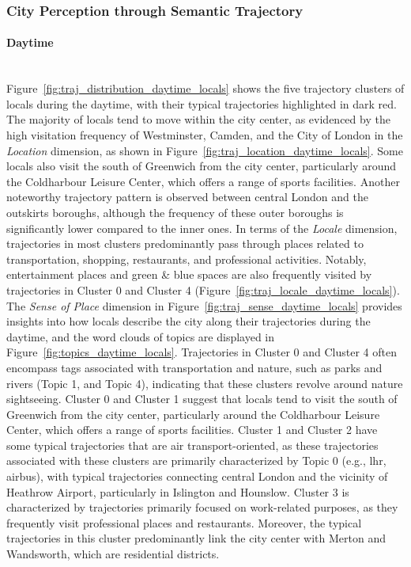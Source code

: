 \documentclass{article}
\newcommand{\subsubsubsection}[1]{\paragraph{#1}\mbox{}\\}
\theoremstyle{definition}
\theoremstyle{remark}
\begin{document}
\subsubsection{City Perception through Semantic Trajectory} \label{perception_through_traj}


\subsubsubsection{Daytime}

Figure~\ref{fig:traj_distribution_daytime_locals} shows the five trajectory clusters of locals during the daytime, with their typical trajectories highlighted in dark red. The majority of locals tend to move within the city center, as evidenced by the high visitation frequency of Westminster, Camden, and the City of London in the \textit{Location} dimension, as shown in Figure~\ref{fig:traj_location_daytime_locals}. Some locals also visit the south of Greenwich from the city center, particularly around the Coldharbour Leisure Center, which offers a range of sports facilities. Another noteworthy trajectory pattern is observed between central London and the outskirts boroughs, although the frequency of these outer boroughs is significantly lower compared to the inner ones. In terms of the \textit{Locale} dimension, trajectories in most clusters predominantly pass through places related to transportation, shopping, restaurants, and professional activities. Notably, entertainment places and green \& blue spaces are also frequently visited by trajectories in Cluster 0 and Cluster 4 (Figure~\ref{fig:traj_locale_daytime_locals}). The \textit{Sense of Place} dimension in Figure~\ref{fig:traj_sense_daytime_locals} provides insights into how locals describe the city along their trajectories during the daytime, and the word clouds of topics are displayed in Figure~\ref{fig:topics_daytime_locals}. Trajectories in Cluster 0 and Cluster 4 often encompass tags associated with transportation and nature, such as parks and rivers (Topic 1, and Topic 4), indicating that these clusters revolve around nature sightseeing. Cluster 0 and Cluster 1 suggest that locals tend to visit the south of Greenwich from the city center, particularly around the Coldharbour Leisure Center, which offers a range of sports facilities. Cluster 1 and Cluster 2 have some typical trajectories that are air transport-oriented, as these trajectories associated with these clusters are primarily characterized by Topic 0 (e.g., lhr, airbus), with typical trajectories connecting central London and the vicinity of Heathrow Airport, particularly in Islington and Hounslow. Cluster 3 is characterized by trajectories primarily focused on work-related purposes, as they frequently visit professional places and restaurants. Moreover, the typical trajectories in this cluster predominantly link the city center with Merton and Wandsworth, which are residential districts.
\end{document}

